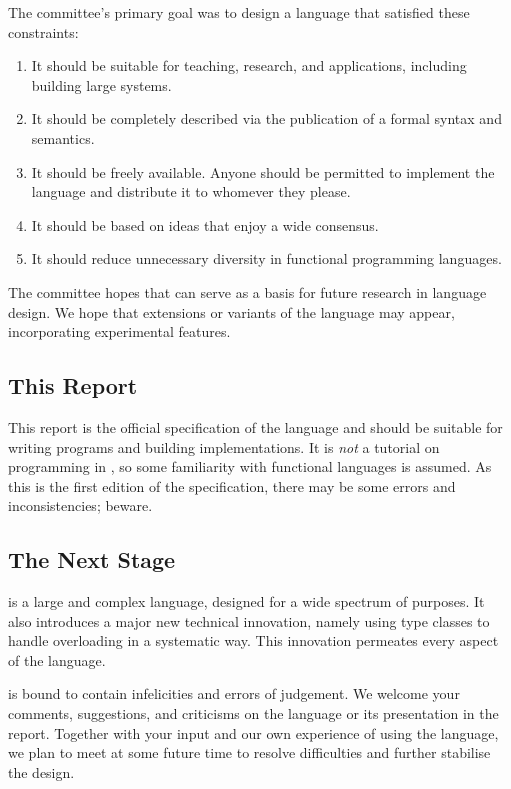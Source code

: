 The committee's primary goal was to design a language that
satisfied these constraints:
\begin{enumerate}
\item It should be suitable for teaching, research, and applications,
      including building large systems.
\item It should be completely described via the publication of a formal
      syntax and semantics.
\item It should be freely available.  Anyone should be permitted to
      implement the language and distribute it to whomever they please.
\item It should be based on ideas that enjoy a wide consensus.  
\item It should reduce unnecessary diversity in functional 
      programming languages.
\end{enumerate}
The committee hopes that \Haskell{} can serve as a
basis for future research in language design.
We hope that extensions or
variants of the language may appear, incorporating experimental
features.

\subsection*{This Report}

This report is the official specification of the \Haskell{}
language and should be suitable for writing programs and building
implementations.  It is {\em not} a tutorial on programming in
\Haskell{}, so some familiarity with functional languages is assumed.
As this is the first edition of the specification, there may be some errors
and inconsistencies; beware.

\subsection*{The Next Stage}

\Haskell{} is a large and complex language, designed
for a wide spectrum of purposes.  It also introduces a major new 
technical innovation, namely using type classes to handle overloading in
a systematic way.  This innovation permeates every aspect of the language.

\Haskell{} is bound to contain infelicities and
errors of judgement.   We welcome your
comments, suggestions, and criticisms on the language or its presentation in
the report.  Together with your input and our own experience of using
the language, we plan to meet at some future time to resolve
difficulties and further stabilise the design.

